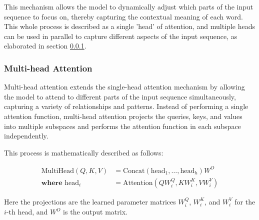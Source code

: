                 This mechanism allows the model to dynamically adjust which parts of the input sequence to focus on, thereby capturing the contextual meaning of each word. This whole process is described as a single 'head' of attention, and multiple heads can be used in parallel to capture different aspects of the input sequence, as elaborated in section \ref{Multi-head Attention}.

            \subsubsection{Multi-head Attention}\label{Multi-head Attention}
                Multi-head attention extends the single-head attention mechanism by allowing the model to attend to different parts of the input sequence simultaneously, capturing a variety of relationships and patterns. Instead of performing a single attention function, multi-head attention projects the queries, keys, and values into multiple subspaces and performs the attention function in each subspace independently.

                This process is mathematically described as follows:

                \begin{align}
                    \text{MultiHead}(Q, K, V) &= \text{Concat}(\text{head}_1, \ldots, \text{head}_h)W^O \\
                    \textbf{where } \text{head}_i &= \text{Attention}(QW_i^Q, KW_i^K, VW_i^V)
                \end{align}

                Here the projections are the learned parameter matrices  \(W_i^Q\), \(W_i^K\), and \(W_i^V\) for the \(i\)-th head, and \(W^O\) is the output matrix.

